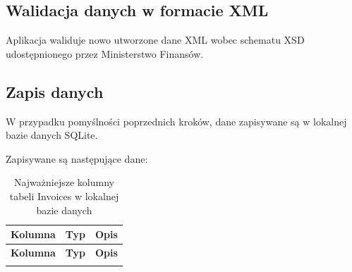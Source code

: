 \subsection{Walidacja danych w formacie XML}
Aplikacja waliduje nowo utworzone dane XML wobec schematu XSD
udostępnionego przez Ministerstwo Finansów.

\subsection{Zapis danych}
W przypadku pomyślności poprzednich kroków, dane zapisywane są w lokalnej bazie danych SQLite.

\noindent Zapisywane są następujące dane:
\begin{small}
\begin{longtable}{>{\raggedright\arraybackslash}p{4cm} >{\raggedright\arraybackslash}p{2cm} >{\raggedright\arraybackslash}p{7cm}}
\caption{Najważniejsze kolumny tabeli Invoices w lokalnej bazie danych}
\label{tab:sqlite_invoices} \\
\toprule
\textbf{Kolumna} & \textbf{Typ} & \textbf{Opis} \\
\midrule
\endfirsthead

\toprule
\textbf{Kolumna} & \textbf{Typ} & \textbf{Opis} \\
\midrule
\endhead

\bottomrule
\endfoot


\end{longtable}
\end{small}
